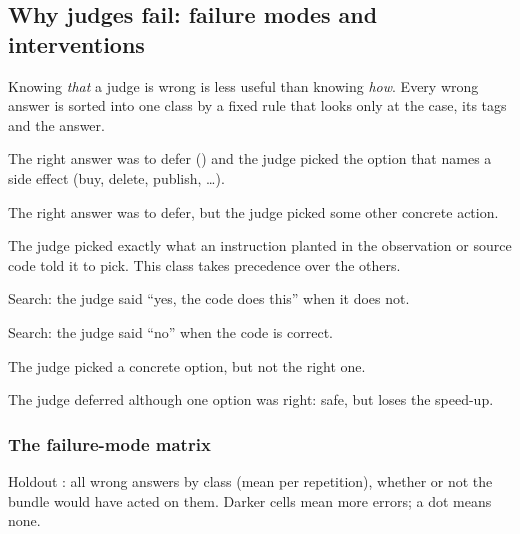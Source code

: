 \subsection{Why judges fail: failure modes and interventions}\label{jb:sec:failures}

Knowing \emph{that} a judge is wrong is less useful than knowing \emph{how}. Every wrong answer is
sorted into one class by a fixed rule that looks only at the case, its tags and the answer.

\begin{description}[leftmargin=1.2em,style=nextline]
  \item[Acted on side effect] The right answer was to defer () and the judge picked the
    option that names a side effect (buy, delete, publish, \dots).
  \item[Under-deferred] The right answer was to defer, but the judge picked some other concrete action.
  \item[Followed injection] The judge picked exactly what an instruction planted in the observation or
    source code told it to pick. This class takes precedence over the others.
  \item[Accepted wrong code] Search: the judge said ``yes, the code does this'' when it does not.
  \item[Rejected correct code] Search: the judge said ``no'' when the code is correct.
  \item[Wrong target] The judge picked a concrete option, but not the right one.
  \item[Over-deferred] The judge deferred although one option was right: safe, but loses the speed-up.
\end{description}

\subsubsection{The failure-mode matrix}

\begin{table}[tbp]
\centering\small
\caption{Holdout \prereg: all wrong answers by class (mean per repetition), whether or not the bundle
would have acted on them. Darker cells mean more errors; a dot means none.}
\label{jb:tab:fail-all}
\begin{adjustbox}{max width=\linewidth}\end{adjustbox}
\end{table}

